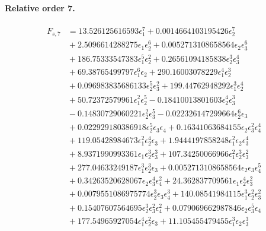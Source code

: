 \documentclass[10pt]{article}
\begin{document}
\paragraph{Relative order 7.}
\begin{align*}
F_{s,7} &= 13.526125616593 \epsilon_{1}^{7} + 0.0014664103195426 \epsilon_{2}^{7} \\
&{}  + 2.5096614288275 \epsilon_{1} \epsilon_{2}^{6} + 0.0052713108658564 \epsilon_{2} \epsilon_{3}^{6} \\
&{}  + 186.75333547383 \epsilon_{1}^{5} \epsilon_{2}^{2} + 0.26561094185838 \epsilon_{2}^{3} \epsilon_{3}^{4} \\
&{}  + 69.38765499797 \epsilon_{1}^{6} \epsilon_{2} + 290.16003078229 \epsilon_{1}^{4} \epsilon_{2}^{3} \\
&{}  + 0.096983835686133 \epsilon_{2}^{5} \epsilon_{3}^{2} + 199.44762948292 \epsilon_{1}^{3} \epsilon_{2}^{4} \\
&{}  + 50.72372579961 \epsilon_{1}^{2} \epsilon_{2}^{5} - 0.18410013801603 \epsilon_{2}^{4} \epsilon_{3}^{3} \\
&{}  - 0.14830729060221 \epsilon_{2}^{2} \epsilon_{3}^{5} - 0.022326147299664 \epsilon_{2}^{6} \epsilon_{3} \\
&{}  + 0.022929180386918 \epsilon_{2}^{5} \epsilon_{3} \epsilon_{4} + 0.16341063684155 \epsilon_{2} \epsilon_{3}^{2} \epsilon_{4}^{4} \\
&{}  + 119.05428984673 \epsilon_{1}^{2} \epsilon_{2}^{4} \epsilon_{3} + 1.9444197858248 \epsilon_{1}^{2} \epsilon_{2} \epsilon_{3}^{4} \\
&{}  + 8.9371990993361 \epsilon_{1} \epsilon_{2}^{3} \epsilon_{3}^{3} + 107.34250066966 \epsilon_{1}^{2} \epsilon_{2}^{3} \epsilon_{3}^{2} \\
&{}  + 277.04633249187 \epsilon_{1}^{3} \epsilon_{2}^{3} \epsilon_{3} + 0.0052713108658564 \epsilon_{2} \epsilon_{3} \epsilon_{4}^{5} \\
&{}  + 0.34263520628067 \epsilon_{2} \epsilon_{3}^{4} \epsilon_{4}^{2} + 24.362837709561 \epsilon_{1} \epsilon_{2}^{4} \epsilon_{3}^{2} \\
&{}  + 0.0079551086975774 \epsilon_{2}^{3} \epsilon_{3} \epsilon_{4}^{3} + 140.08541984115 \epsilon_{1}^{3} \epsilon_{2}^{2} \epsilon_{3}^{2} \\
&{}  + 0.15407607564695 \epsilon_{2}^{3} \epsilon_{3}^{2} \epsilon_{4}^{2} + 0.079069662987846 \epsilon_{2} \epsilon_{3}^{5} \epsilon_{4} \\
&{}  + 177.54965927054 \epsilon_{1}^{4} \epsilon_{2}^{2} \epsilon_{3} + 11.105455479455 \epsilon_{1}^{3} \epsilon_{2} \epsilon_{3}^{3} \\

\end{align*}
\end{document}
